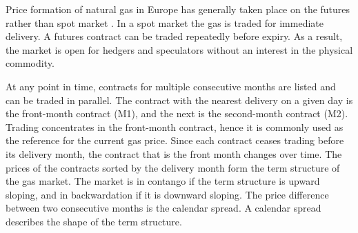 Price formation of natural gas in Europe has generally taken place on the futures rather than spot market \parencite{obadiDRIVINGFUNDAMENTALSNATURAL2020}. In a spot market the gas is traded for immediate delivery. A futures contract can be traded repeatedly before expiry. As a result, the market is open for hedgers and speculators without an interest in the physical commodity.

At any point in time, contracts for multiple consecutive months are listed and can be traded in parallel. The contract with the nearest delivery on a given day is the front-month contract (M1), and the next is the second-month contract (M2). Trading concentrates in the front-month contract, hence it is commonly used as the reference for the current gas price. Since each contract ceases trading before its delivery month, the contract that is the front month changes over time. The prices of the contracts sorted by the delivery month form the term structure of the gas market. The market is in contango if the term structure is upward sloping, and in backwardation if it is downward sloping. The price difference between two consecutive months is the calendar spread. A calendar spread describes the shape of the term structure. 